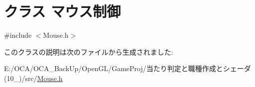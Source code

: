 \hypertarget{class_xE3_x83_x9E_xE3_x82_xA6_xE3_x82_xB9_xE5_x88_xB6_xE5_xBE_xA1}{\section{クラス マウス制御}
\label{class_xE3_x83_x9E_xE3_x82_xA6_xE3_x82_xB9_xE5_x88_xB6_xE5_xBE_xA1}
}


{\ttfamily \#include $<$Mouse.\-h$>$}



このクラスの説明は次のファイルから生成されました\-:\begin{DoxyCompactItemize}
\item 
E\-:/\-O\-C\-A/\-O\-C\-A\-\_\-\-Back\-Up/\-Open\-G\-L/\-Game\-Proj/当たり判定と職種作成とシェーダ(10\-\_)/src/\hyperlink{_mouse_8h}{Mouse.\-h}\end{DoxyCompactItemize}
